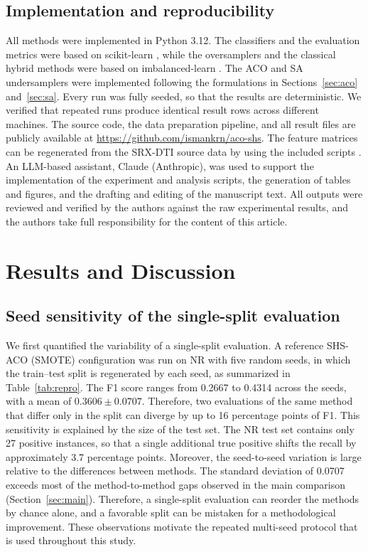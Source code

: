 \documentclass[10pt,a4paper]{article}
\begin{document}
\subsection{Implementation and reproducibility}
All methods were implemented in Python 3.12. The classifiers and the
evaluation metrics were based on scikit-learn
\citep{pedregosa2011scikit}, while the oversamplers and the classical
hybrid methods were based on imbalanced-learn
\citep{lemaitre2017imbalanced}. The ACO and SA undersamplers were
implemented following the formulations in Sections~\ref{sec:aco} and~\ref{sec:sa}. Every
run was fully seeded, so that the results are deterministic. We
verified that repeated runs produce identical result rows across
different machines. The source code, the data preparation pipeline, and all result
files are publicly available at
\url{https://github.com/ismankrn/aco-shs}. The feature matrices can be
regenerated from the SRX-DTI source data by using the included scripts
\citep{khojasteh2023improving}. An LLM-based assistant, Claude (Anthropic), was used to
support the implementation of the experiment and analysis scripts,
the generation of tables and figures, and the drafting and editing of
the manuscript text. All outputs were reviewed and verified by the
authors against the raw experimental results, and the authors take
full responsibility for the content of this article.

\section{Results and Discussion}

\subsection{Seed sensitivity of the single-split evaluation}
\label{sec:seed}
We first quantified the variability of a single-split evaluation. A
reference SHS-ACO (SMOTE) configuration was run on NR with five random
seeds, in which the train--test split is regenerated by each seed, as
summarized in Table~\ref{tab:repro}. The F1 score ranges from 0.2667 to
0.4314 across the seeds, with a mean of $0.3606 \pm 0.0707$. Therefore,
two evaluations of the same method that differ only in the split can
diverge by up to 16 percentage points of F1. This sensitivity is explained
by the size of the test set. The NR test set contains only 27 positive
instances, so that a single additional true positive shifts the recall
by approximately 3.7 percentage points. Moreover, the seed-to-seed
variation is large relative to the differences between methods. The
standard deviation of 0.0707 exceeds most of the method-to-method gaps
observed in the main comparison (Section~\ref{sec:main}). Therefore, a
single-split evaluation can reorder the methods by chance alone, and a
favorable split can be mistaken for a methodological improvement. These
observations motivate the repeated multi-seed protocol that is used
throughout this study.
\end{document}
